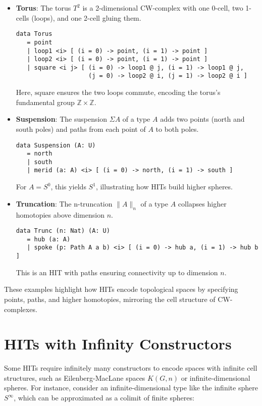 \documentclass{article}
\theoremstyle{definition}
\begin{document}
\begin{itemize}
    \item \textbf{Torus}: The torus \( T^2 \) is a 2-dimensional CW-complex with one 0-cell, two 1-cells (loops), and one 2-cell gluing them.
    \begin{lstlisting}
data Torus
   = point
   | loop1 <i> [ (i = 0) -> point, (i = 1) -> point ]
   | loop2 <i> [ (i = 0) -> point, (i = 1) -> point ]
   | square <i j> [ (i = 0) -> loop1 @ j, (i = 1) -> loop1 @ j,
                    (j = 0) -> loop2 @ i, (j = 1) -> loop2 @ i ]
    \end{lstlisting}
    Here, \( \text{square} \) ensures the two loops commute, encoding the torus’s fundamental group \( \mathbb{Z} \times \mathbb{Z} \).

    \item \textbf{Suspension}: The suspension \( \Sigma A \) of a type \( A \) adds two points (north and south poles) and paths from each point of \( A \) to both poles.
    \begin{lstlisting}
data Suspension (A: U)
   = north
   | south
   | merid (a: A) <i> [ (i = 0) -> north, (i = 1) -> south ]
    \end{lstlisting}
    For \( A = S^0 \), this yields \( S^1 \), illustrating how HITs build higher spheres.

    \item \textbf{Truncation}: The n-truncation \( \| A \|_n \) of a type \( A \) collapses higher homotopies above dimension \( n \).
    \begin{lstlisting}
data Trunc (n: Nat) (A: U)
   = hub (a: A)
   | spoke (p: Path A a b) <i> [ (i = 0) -> hub a, (i = 1) -> hub b ]
    \end{lstlisting}
    This is an HIT with paths ensuring connectivity up to dimension \( n \).
\end{itemize}

These examples highlight how HITs encode topological spaces by specifying points, paths, and higher homotopies, mirroring the cell structure of CW-complexes.

\section{HITs with Infinity Constructors}
Some HITs require infinitely many constructors to encode spaces with infinite cell structures, such as Eilenberg-MacLane spaces \( K(G, n) \) or infinite-dimensional spheres. For instance, consider an infinite-dimensional type like the infinite sphere \( S^\infty \), which can be approximated as a colimit of finite spheres:
\end{document}
